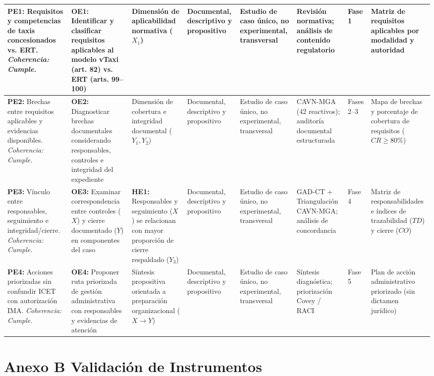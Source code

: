 {\begin{aulatexlandscape}
\begin{longtable}{@{}p{2.9cm}p{2.9cm}p{2.5cm}p{2.2cm}p{2.2cm}p{2.1cm}p{1.6cm}p{2.5cm}@{}}
\midrule
\textbf{PE1:} Requisitos y competencias de taxis concesionados vs. ERT. \textit{Coherencia: Cumple.} & \textbf{OE1:} Identificar y clasificar requisitos aplicables al modelo vTaxi (art. 82) vs. ERT (arts. 99--100) & Dimensión de aplicabilidad normativa ($X_1$) & Documental, descriptivo y propositivo & Estudio de caso único, no experimental, transversal & Revisión normativa; análisis de contenido regulatorio & Fase 1 & Matriz de requisitos aplicables por modalidad y autoridad \\
\midrule
\textbf{PE2:} Brechas entre requisitos aplicables y evidencias disponibles. \textit{Coherencia: Cumple.} & \textbf{OE2:} Diagnosticar brechas documentales considerando responsables, controles e integridad del expediente & Dimensión de cobertura e integridad documental ($Y_1, Y_2$) & Documental, descriptivo y propositivo & Estudio de caso único, no experimental, transversal & CAVN-MGA (42 reactivos); auditoría documental estructurada & Fases 2--3 & Mapa de brechas y porcentaje de cobertura de requisitos ($CR \ge 80\%$) \\
\midrule
\textbf{PE3:} Vínculo entre responsables, seguimiento e integridad/cierre. \textit{Coherencia: Cumple.} & \textbf{OE3:} Examinar correspondencia entre controles ($X$) y cierre documentado ($Y$) en componentes del caso & \textbf{HE1:} Responsables y seguimiento ($X$) se relacionan con mayor proporción de cierre respaldado ($Y_3$) & Documental, descriptivo y propositivo & Estudio de caso único, no experimental, transversal & GAD-CT + Triangulación CAVN-MGA; análisis de concordancia & Fase 4 & Matriz de responsabilidades e índices de trazabilidad ($TD$) y cierre ($CO$) \\
\midrule
\textbf{PE4:} Acciones priorizadas sin confundir ICET con autorización IMA. \textit{Coherencia: Cumple.} & \textbf{OE4:} Proponer ruta priorizada de gestión administrativa con responsables y evidencias de atención & Síntesis propositiva orientada a preparación organizacional ($X \rightarrow Y$) & Documental, descriptivo y propositivo & Estudio de caso único, no experimental, transversal & Síntesis diagnóstica; priorización Covey / RACI & Fase 5 & Plan de acción administrativo priorizado (sin dictamen jurídico) \\
\bottomrule
\end{longtable}
\endgroup
\end{aulatexlandscape}

\clearpage
\section*{Anexo B Validación de Instrumentos}
}
